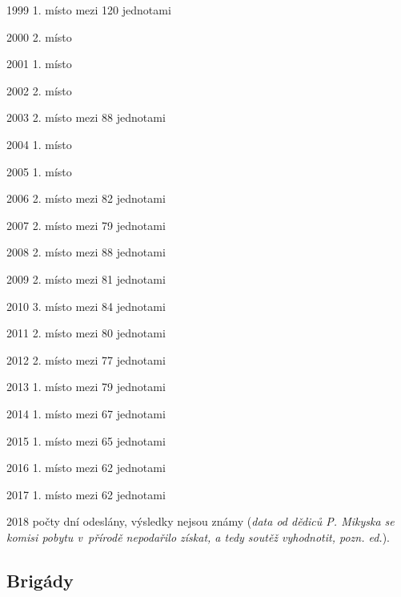 \documentclass[a5paper, 11pt, twoside]{article}
\begin{document}
1999 1. místo mezi 120 jednotami

2000 2. místo

2001 1. místo

2002 2. místo

2003 2. místo mezi 88 jednotami

2004 1. místo

2005 1. místo

2006 2. místo mezi 82 jednotami

2007 2. místo mezi 79 jednotami

2008 2. místo mezi 88 jednotami

2009 2. místo mezi 81 jednotami

2010 3. místo mezi 84 jednotami

2011 2. místo mezi 80 jednotami

2012 2. místo mezi 77 jednotami

2013 1. místo mezi 79 jednotami

2014 1. místo mezi 67 jednotami

2015 1. místo mezi 65 jednotami

2016 1. místo mezi 62 jednotami

2017 1. místo mezi 62 jednotami

2018 počty dní odeslány, výsledky nejsou známy (\textit{data od dědiců P.
Mikyska se komisi pobytu v~přírodě nepodařilo získat, a tedy soutěž
vyhodnotit, pozn. ed.}).

\subsection{Brigády}
\end{document}
